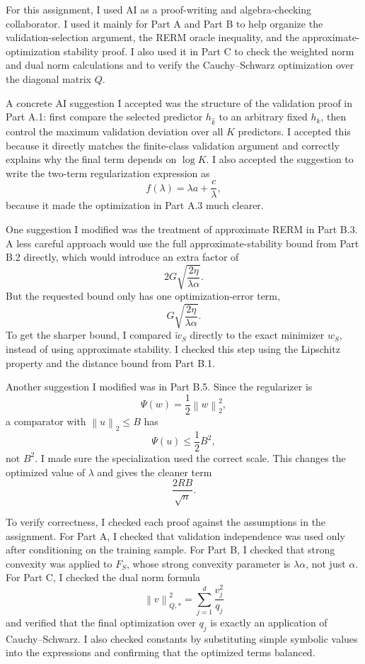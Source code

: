 \documentclass[11pt]{article}
\newcommand{\norm}[1]{\left\lVert #1 \right\rVert}
\begin{document}
\begin{solutionbox}
For this assignment, I used AI as a proof-writing and algebra-checking collaborator. I used it mainly for Part A and Part B to help organize the validation-selection argument, the RERM oracle inequality, and the approximate-optimization stability proof. I also used it in Part C to check the weighted norm and dual norm calculations and to verify the Cauchy--Schwarz optimization over the diagonal matrix $Q$.

A concrete AI suggestion I accepted was the structure of the validation proof in Part A.1: first compare the selected predictor $h_{\widehat k}$ to an arbitrary fixed $h_k$, then control the maximum validation deviation over all $K$ predictors. I accepted this because it directly matches the finite-class validation argument and correctly explains why the final term depends on $\log K$. I also accepted the suggestion to write the two-term regularization expression as
\[
f(\lambda)=\lambda a+\frac{c}{\lambda},
\]
because it made the optimization in Part A.3 much clearer.

One suggestion I modified was the treatment of approximate RERM in Part B.3. A less careful approach would use the full approximate-stability bound from Part B.2 directly, which would introduce an extra factor of
\[
2G\sqrt{\frac{2\eta}{\lambda\alpha}}.
\]
But the requested bound only has one optimization-error term,
\[
G\sqrt{\frac{2\eta}{\lambda\alpha}}.
\]
To get the sharper bound, I compared $\widetilde w_S$ directly to the exact minimizer $w_S$, instead of using approximate stability. I checked this step using the Lipschitz property and the distance bound from Part B.1.

Another suggestion I modified was in Part B.5. Since the regularizer is
\[
\Psi(w)=\frac12\norm{w}_2^2,
\]
a comparator with $\norm{u}_2\le B$ has
\[
\Psi(u)\le\frac12B^2,
\]
not $B^2$. I made sure the specialization used the correct scale. This changes the optimized value of $\lambda$ and gives the cleaner term
\[
\frac{2RB}{\sqrt n}.
\]

To verify correctness, I checked each proof against the assumptions in the assignment. For Part A, I checked that validation independence was used only after conditioning on the training sample. For Part B, I checked that strong convexity was applied to $F_S$, whose strong convexity parameter is $\lambda\alpha$, not just $\alpha$. For Part C, I checked the dual norm formula
\[
\norm{v}_{Q,*}^2=\sum_{j=1}^d\frac{v_j^2}{q_j}
\]
and verified that the final optimization over $q_j$ is exactly an application of Cauchy--Schwarz. I also checked constants by substituting simple symbolic values into the expressions and confirming that the optimized terms balanced.


\end{solutionbox}
\end{document}
